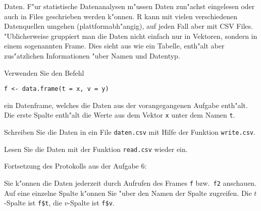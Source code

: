Daten. F"ur statistische Datenanalysen m"ussen Daten zun"achst eingelesen
oder auch in Files geschrieben werden k"onnen.
R kann mit vielen verschiedenen Datenquellen umgehen
(plattformabh"angig), auf jeden Fall aber mit CSV Files.
"Ublicherweise gruppiert man die Daten nicht einfach nur in Vektoren, sondern
in einem sogenannten Frame. Dies sieht aus wie ein Tabelle, enth"alt aber
zus"atzlichen Informationen "uber Namen und Datentyp.
\begin{teilaufgaben}
\item Verwenden Sie den Befehl
\begin{verbatim}
f <- data.frame(t = x, v = y)
\end{verbatim}
ein Datenframe, welches die Daten aus der vorangegangenen
Aufgabe enth"alt. Die erste Spalte enth"alt die Werte aus dem Vektor
{\tt x} unter dem Namen {\tt t}.
\item Schreiben Sie die Daten in ein File {\tt daten.csv} mit Hilfe der
Funktion {\tt write.csv}.
\item Lesen Sie die Daten mit der Funktion {\tt read.csv} wieder ein.
\end{teilaufgaben}

\begin{loesung}
Fortsetzung des Protokolls aus der Aufgabe 6:


Sie k"onnen die Daten jederzeit durch Aufrufen des Frames {\tt f}
bzw.~{\tt f2} anschauen. Auf eine einzelne Spalte k"onnen Sie "uber
den Namen der Spalte zugreifen. Die $t$-Spalte ist {\tt f\$t},
die $v$-Spalte ist {\tt f\$v}.
\end{loesung}

